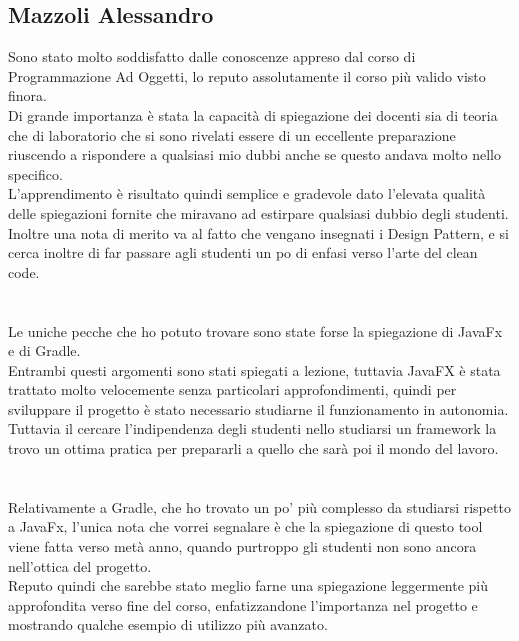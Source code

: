 \documentclass[a4paper,12pt]{report}
\begin{document}
\subsection{Mazzoli Alessandro}
Sono stato molto soddisfatto dalle conoscenze appreso dal corso di Programmazione Ad Oggetti, lo reputo assolutamente il corso più valido visto finora.
\\
Di grande importanza è stata la capacità di spiegazione dei docenti sia di teoria che di laboratorio che si sono rivelati essere di un eccellente preparazione riuscendo a rispondere a qualsiasi mio dubbi anche se questo andava molto nello specifico.
\\
L'apprendimento è risultato quindi semplice e gradevole dato l'elevata qualità delle spiegazioni fornite che miravano ad estirpare qualsiasi dubbio degli studenti.
\\
Inoltre una nota di merito va al fatto che vengano insegnati i Design Pattern, e si cerca inoltre di far passare agli studenti un po di enfasi verso l'arte del clean code.
\paragraph{}
\
\\
Le uniche pecche che ho potuto trovare sono state forse la spiegazione di JavaFx e di Gradle.
\\
Entrambi questi argomenti sono stati spiegati a lezione, tuttavia JavaFX è stata trattato molto velocemente senza particolari approfondimenti, quindi per sviluppare il progetto è stato necessario studiarne il funzionamento in autonomia.
\\
Tuttavia il cercare l'indipendenza degli studenti nello studiarsi un framework la trovo un ottima pratica per prepararli a quello che sarà poi il mondo del lavoro.
\paragraph{}
\
\\
Relativamente a Gradle, che ho trovato un po' più complesso da studiarsi rispetto a JavaFx, l'unica nota che vorrei segnalare è che la spiegazione di questo tool viene fatta verso metà anno, quando purtroppo gli studenti non sono ancora nell'ottica del progetto.
\\
Reputo quindi che sarebbe stato meglio farne una spiegazione leggermente più approfondita verso fine del corso, enfatizzandone l'importanza nel progetto e mostrando qualche esempio di utilizzo più avanzato.
\end{document}
